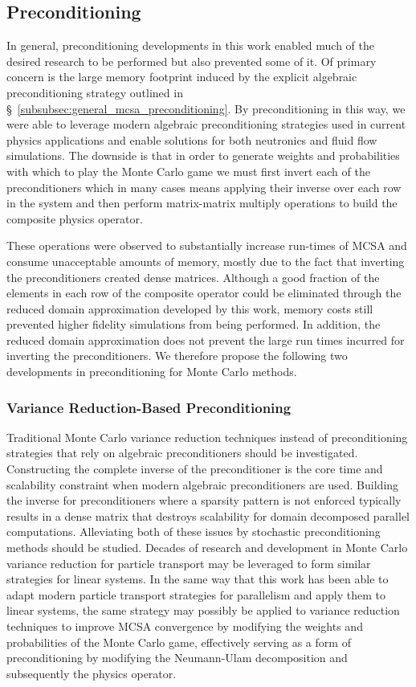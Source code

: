 \subsection{Preconditioning}
\label{subsec:future_preconditioning}
In general, preconditioning developments in this work enabled much of
the desired research to be performed but also prevented some of it. Of
primary concern is the large memory footprint induced by the explicit
algebraic preconditioning strategy outlined in
\S~\ref{subsubsec:general_mcsa_preconditioning}. By preconditioning in
this way, we were able to leverage modern algebraic preconditioning
strategies used in current physics applications and enable solutions
for both neutronics and fluid flow simulations. The downside is that
in order to generate weights and probabilities with which to play the
Monte Carlo game we must first invert each of the preconditioners
which in many cases means applying their inverse over each row in the
system and then perform matrix-matrix multiply operations to build the
composite physics operator.

These operations were observed to substantially increase run-times of
MCSA and consume unacceptable amounts of memory, mostly due to the
fact that inverting the preconditioners created dense
matrices. Although a good fraction of the elements in each row of the
composite operator could be eliminated through the reduced domain
approximation developed by this work, memory costs still prevented
higher fidelity simulations from being performed. In addition, the
reduced domain approximation does not prevent the large run times
incurred for inverting the preconditioners. We therefore propose the
following two developments in preconditioning for Monte Carlo
methods.

\subsubsection{Variance Reduction-Based Preconditioning}
Traditional Monte Carlo variance reduction techniques instead of
preconditioning strategies that rely on algebraic preconditioners
should be investigated. Constructing the complete inverse of the
preconditioner is the core time and scalability constraint when modern
algebraic preconditioners are used. Building the inverse for
preconditioners where a sparsity pattern is not enforced typically
results in a dense matrix that destroys scalability for domain
decomposed parallel computations. Alleviating both of these issues by
stochastic preconditioning methods should be studied. Decades of
research and development in Monte Carlo variance reduction for
particle transport \cite{booth_1994} may be leveraged to form similar
strategies for linear systems. In the same way that this work has been
able to adapt modern particle transport strategies for parallelism and
apply them to linear systems, the same strategy may possibly be
applied to variance reduction techniques to improve MCSA convergence
by modifying the weights and probabilities of the Monte Carlo game,
effectively serving as a form of preconditioning by modifying the
Neumann-Ulam decomposition and subsequently the physics operator.


